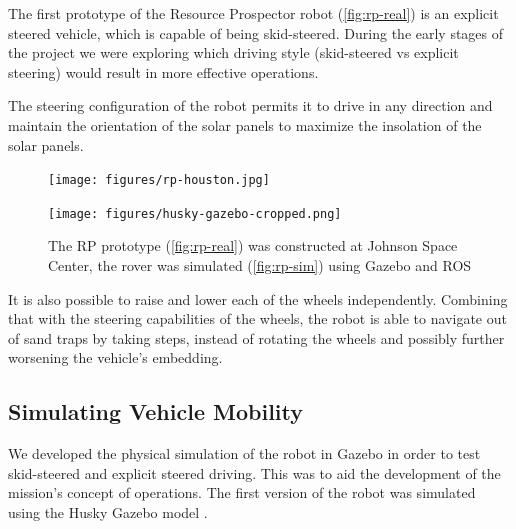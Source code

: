 \documentclass[twocolumn,letterpaper]{IEEEAerospaceCLS}  %
\begin{document}
The first prototype of the Resource Prospector robot (\cref{fig:rp-real}) is an explicit steered vehicle, which is capable of being skid-steered.  During the early stages of the project we were exploring which driving style (skid-steered vs explicit steering) would result in more effective operations.   

The steering configuration of the robot permits it to drive in any direction and maintain the orientation of the solar panels to maximize the insolation of the solar panels.  


\begin{figure}[htp]
\begin{subfloat}{
\texttt{[image: figures/rp-houston.jpg]}\label{fig:rp-real}
}
\end{subfloat}
\qquad
\begin{subfloat}{
\texttt{[image: figures/husky-gazebo-cropped.png]}\label{fig:rp-sim}
}
\end{subfloat}
\caption{The RP prototype (\protect\cref{fig:rp-real}) was constructed at Johnson Space Center, the rover was simulated (\protect\cref{fig:rp-sim}) using Gazebo and ROS \label{fig:rover-by-sim}}
\end{figure}

It is also possible to raise and lower each of the wheels independently. 
Combining that with the steering capabilities of the wheels, the robot is able to navigate out of sand traps by taking steps, instead of rotating the wheels and possibly further worsening the vehicle's embedding.

\subsection{Simulating Vehicle Mobility}
\label{sec:simulated-rover}

We developed the physical simulation of the robot in Gazebo in order to test skid-steered and explicit steered driving. This was to aid the development of the mission's concept of operations.  The first version of the robot was simulated using the Husky Gazebo model \cite{gariepy2015husky}.  
\end{document}
